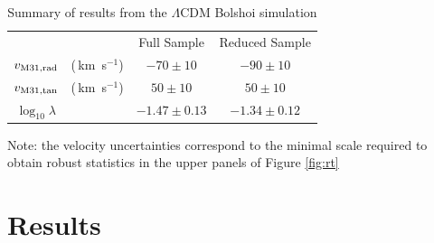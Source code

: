 \documentclass{emulateapj}
\newcommand{\kms}{\,km~s$^{-1}$}
\begin{document}
\begin{table}
\caption{Summary of results from the $\Lambda$CDM Bolshoi simulation}
\begin{center}
\begin{tabular}{cccc}\hline
 &  & Full Sample & Reduced Sample\\
$v_{\rm M31,rad}$ &(\kms) & $-70\pm 10$ & $-90\pm 10$\\
$v_{\rm M31,tan}$ &(\kms) & $50\pm 10$ & $50\pm 10$\\
$\log_{10}\lambda$& & $-1.47\pm 0.13$& $-1.34\pm 0.12$\\\hline
\end{tabular}
\end{center}
\vspace{1mm}
Note: the velocity uncertainties correspond to the minimal scale required to
obtain robust statistics in the upper panels of Figure \ref{fig:rt}
\label{table:2}
\end{table}


\section{Results}
\label{sec:results}
\end{document}
